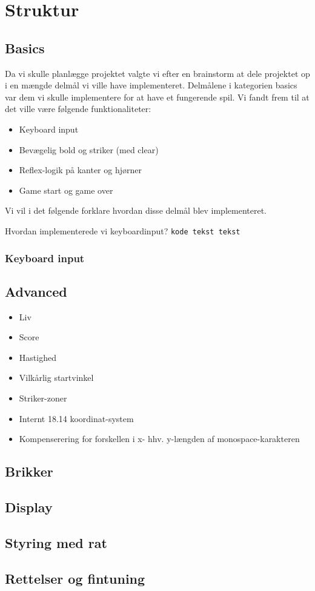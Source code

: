 \chapter{Struktur}
\section{Basics}
Da vi skulle planlægge projektet valgte vi efter en brainstorm at dele projektet op i en mængde delmål vi ville have implementeret. Delmålene i kategorien basics var dem vi skulle implementere for at have et fungerende spil. Vi fandt frem til at det ville være følgende funktionaliteter:
\begin{itemize}
\item Keyboard input
\item Bevægelig bold og striker (med clear)
\item Reflex-logik på kanter og hjørner
\item Game start og game over
\end{itemize}
Vi vil i det følgende forklare hvordan disse delmål blev implementeret. 

Hvordan implementerede vi keyboardinput?
\texttt{kode tekst tekst}

\subsection{Keyboard input}


\section{Advanced}
\begin{itemize}
\item Liv
\item Score
\item Hastighed
\item Vilkårlig startvinkel
\item Striker-zoner
\item Internt 18.14 koordinat-system
\item Kompenserering for forskellen i x- hhv. y-længden af monospace-karakteren
\end{itemize}

\section{Brikker}

\begin{itemize}

\end{itemize}
\section{Display}
\section{Styring med rat}
\section{Rettelser og fintuning}
